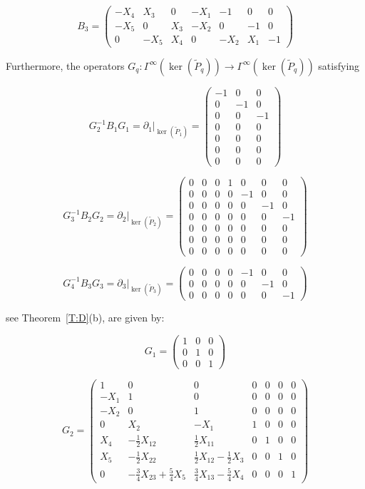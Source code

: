 \documentclass[reqno,12pt]{amsart}
\theoremstyle{plain}
\theoremstyle{definition}
\begin{document}
$$
B_3=\left(\begin{array}{c|cc|c|cc|c}
-X_4&X_3& 0& -X_1&-1& 0& 0\\
-X_5&0&  X_3&-X_2&0&  -1&0\\\hline
0&  -X_5&X_4&    0&     -X_2&X_1&-1
\end{array}\right)
$$


Furthermore, the operators $G_q\colon\Gamma^\infty(\ker(\tilde P_q))\to\Gamma^\infty(\ker(\tilde P_q))$ satisfying

$$
G_2^{-1}B_1G_1=\partial_1|_{\ker(\tilde P_1)}=\left(\begin{array}{c|cc}
-1&0& 0\\\hline
0& -1&0\\ 
0& 0& -1\\\hline
0& 0& 0\\\hline
0& 0& 0\\
0& 0& 0\\\hline
0& 0& 0  
\end{array}\right)
$$

$$
G_3^{-1}B_2G_2=\partial_2|_{\ker(\tilde P_2)}=\left(\begin{array}{c|cc|c|cc|c}
0&0&0&1&0& 0& 0\\\hline
0&0&0&0&-1&0& 0\\
0&0&0&0&0& -1&0\\\hline
0&0&0&0&0& 0& -1\\\hline
0&0&0&0&0& 0& 0\\
0&0&0&0&0& 0& 0\\\hline
0&0&0&0&0& 0& 0  
\end{array}\right)
$$

$$
G_4^{-1}B_3G_3=\partial_3|_{\ker(\tilde P_3)}=\left(\begin{array}{c|cc|c|cc|c}
0&0&0&0&-1&0& 0\\
0&0&0&0&0& -1&0\\\hline
0&0&0&0&0& 0& -1
\end{array}\right)
$$

see Theorem~\ref{T:D}(b), are given by:

$$
G_1=\left(\begin{array}{c|cc}
1&0&0\\\hline
0&1&0\\
0&0&1 
\end{array}\right)
$$

$$
G_2=\left(\begin{array}{c|cc|c|cc|c}
1&  0&                0&               0&0&0&0\\\hline
-X_1&1&                0&               0&0&0&0\\
-X_2&0&                1&               0&0&0&0\\\hline
0&  X_2&               -X_1&             1&0&0&0\\\hline
X_4& -\tfrac12X_{12}&       \tfrac12X_{11}&        0&1&0&0\\
X_5& -\tfrac12X_{22}&        \tfrac12X_{12}-\tfrac12X_3&0&0&1&0\\\hline
0&  -\tfrac34X_{23}+\tfrac54X_5&\tfrac34X_{13}-\tfrac54X_4&0&0&0&1 
\end{array}\right)
$$
\end{document}
